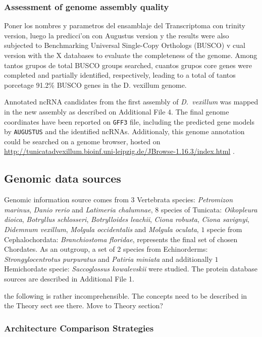 \documentclass[11pt]{article}
\newcommand{\TODO}[1]{\begingroup\color{red}#1\endgroup}
\newcommand{\CAVH}[1]{\begingroup\color{green}#1\endgroup}
\begin{document}
\subsubsection*{Assessment of genome assembly quality} 
\TODO{Poner los nombres y parametros del ensamblaje del Transcriptoma con trinity
version, luego la predicci'on con Augustus version y the results  were also
subjected to Benchmarking Universal Single-Copy Orthologs (BUSCO) v cual version
with the \TODO{X databases} to evaluate the completeness of the genome. Among
tantos grupos de  total BUSCO groups searched, cuantos grupos core genes were
completed and partially identified, respectively, leading to a total of tantos
porcetage 91.2\% BUSCO genes in the D. vexillum genome.}

Annotated ncRNA candidates from the first assembly of \textit{D.\ vexillum} was
mapped in the new assembly as described on Additional File 4. The final genome
coordinates have been reported on \texttt{GFF3} file, including the predicted
gene models by \texttt{AUGUSTUS} and the identified ncRNAs. Additionaly, this
genome annotation could be searched on a genome browser, hosted on
\url{http://tunicatadvexillum.bioinf.uni-leipzig.de/JBrowse-1.16.3/index.html}
\cite{}.
\fi
\subsection*{Genomic data sources}

Genomic information source comes from $3$ Vertebrata species:
\textit{Petromizon marinus}, \textit{Danio rerio} and 
\textit{Latimeria chalumnae}, $8$ species of Tunicata: \textit{Oikopleura 
dioica}, \textit{Botryllus schlosseri}, \textit{Botrylloides 
leachii}, \textit{Ciona robusta}, \textit{Ciona savignyi}, \textit{Didemnum 
vexillum}, \textit{Molgula occidentalis} and \textit{Molgula oculata}, $1$ specie 
from Cephalochordata: \textit{Branchiostoma floridae}, represents the final set 
of chosen Chordates. As an outgroup, a set of $2$ species from Echinorderms: 
\textit{Strongylocentrotus purpuratus} and \textit{Patiria miniata} and 
additionally $1$ Hemichordate specie: \textit{Saccoglossus kowalevskii} were 
studied. The protein database sources are described in Additional File 1. 

\TODO{the following is rather incomprehensible. The concepts need to be described in the Theory sect 
see there.} \CAVH{Move to Theory section?}
\subsubsection*{Architecture Comparison Strategies}
\end{document}
